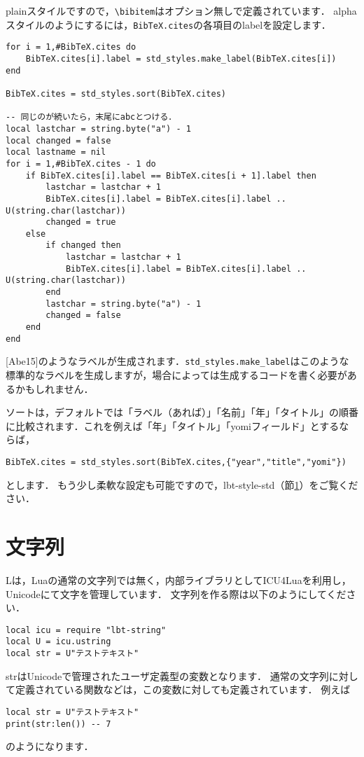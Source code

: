 \documentclass[dvipdfmx,a4paper]{jsarticle}
\DeclareRobustCommand{\LBibTeX}{L\BibTeX}
\begin{document}
plainスタイルですので，\verb|\bibitem|はオプション無しで定義されています．
alphaスタイルのようにするには，\verb|BibTeX.cites|の各項目のlabelを設定します．
\begin{lstlisting}
for i = 1,#BibTeX.cites do
	BibTeX.cites[i].label = std_styles.make_label(BibTeX.cites[i])
end

BibTeX.cites = std_styles.sort(BibTeX.cites)

-- 同じのが続いたら，末尾にabcとつける．
local lastchar = string.byte("a") - 1
local changed = false
local lastname = nil
for i = 1,#BibTeX.cites - 1 do
	if BibTeX.cites[i].label == BibTeX.cites[i + 1].label then
		lastchar = lastchar + 1
		BibTeX.cites[i].label = BibTeX.cites[i].label .. U(string.char(lastchar))
		changed = true
	else
		if changed then
			lastchar = lastchar + 1
			BibTeX.cites[i].label = BibTeX.cites[i].label .. U(string.char(lastchar))
		end
		lastchar = string.byte("a") - 1
		changed = false
	end
end

\end{lstlisting}
[Abe15]のようなラベルが生成されます．\verb|std_styles.make_label|はこのような標準的なラベルを生成しますが，場合によっては生成するコードを書く必要があるかもしれません．

ソートは，デフォルトでは「ラベル（あれば）」「名前」「年」「タイトル」の順番に比較されます．これを例えば「年」「タイトル」「yomiフィールド」とするならば，
\begin{lstlisting}
BibTeX.cites = std_styles.sort(BibTeX.cites,{"year","title","yomi"})
\end{lstlisting}
とします．
もう少し柔軟な設定も可能ですので，lbt-style-std（節\ref{}）をご覧ください．

\section{文字列}
\LBibTeX は，Luaの通常の文字列では無く，内部ライブラリとしてICU4Luaを利用し，Unicodeにて文字を管理しています．
文字列を作る際は以下のようにしてください．
\begin{lstlisting}
local icu = require "lbt-string"
local U = icu.ustring
local str = U"テストテキスト"
\end{lstlisting}

strはUnicodeで管理されたユーザ定義型の変数となります．
通常の文字列に対して定義されている関数などは，この変数に対しても定義されています．
例えば
\begin{lstlisting}
local str = U"テストテキスト"
print(str:len()) -- 7
\end{lstlisting}
のようになります．
\end{document}
